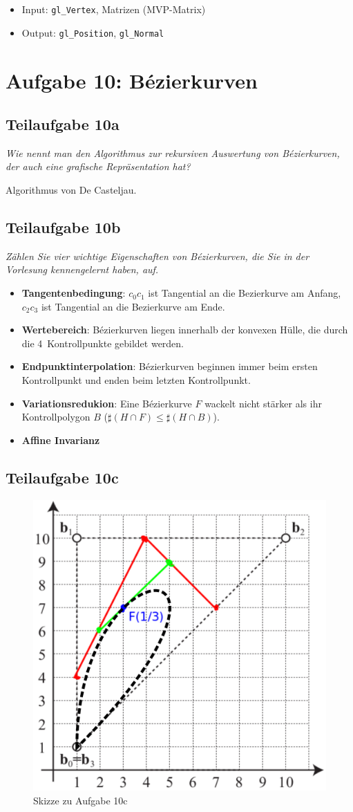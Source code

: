 \documentclass[a4paper]{scrartcl}
\begin{document}
\begin{itemize}
    \item Input: \texttt{gl\_Vertex}, Matrizen (MVP-Matrix)
    \item Output: \texttt{gl\_Position}, \texttt{gl\_Normal}
\end{itemize}


\section*{Aufgabe 10: Bézierkurven}
\subsection*{Teilaufgabe 10a}
\textit{Wie nennt man den Algorithmus zur rekursiven Auswertung von
Bézierkurven, der auch eine grafische Repräsentation hat?}

Algorithmus von De Casteljau.

\clearpage
\subsection*{Teilaufgabe 10b}
\textit{Zählen Sie vier wichtige Eigenschaften von Bézierkurven, die Sie in der
Vorlesung kennengelernt haben, auf.}

\begin{itemize}
    \item \textbf{Tangentenbedingung}:
          $c_0 c_1$ ist Tangential an die Bezierkurve am Anfang,
          $c_2 c_3$ ist Tangential an die Bezierkurve am Ende.
    \item \textbf{Wertebereich}: Bézierkurven liegen innerhalb der konvexen
          Hülle, die durch die 4~Kontrollpunkte gebildet werden.
    \item \textbf{Endpunktinterpolation}: Bézierkurven beginnen immer beim
          ersten Kontrollpunkt und enden beim letzten Kontrollpunkt.
    \item \textbf{Variationsredukion}: Eine Bézierkurve $F$ wackelt nicht stärker
          als ihr Kontrollpolygon $B$ ($\sharp (H \cap F) \leq \sharp (H \cap B)$).
    \item \textbf{Affine Invarianz}
\end{itemize}

\subsection*{Teilaufgabe 10c}
\begin{figure}[h]
    \centering
    \includegraphics*[width=0.7\linewidth, keepaspectratio]{10c-bezier.png}
    \caption{Skizze zu Aufgabe 10c}
    \label{fig:10c}
\end{figure}
\end{document}
